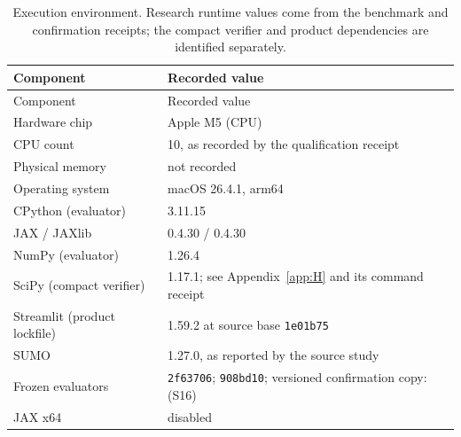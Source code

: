 \documentclass[12pt,a4paper]{article}
\begin{document}
\begingroup
\singlespacing\small
\begin{xltabular}{\textwidth}{@{}lY@{}}
\caption[Execution environment]{Execution environment. Research runtime values come from the benchmark and confirmation receipts; the compact verifier and product dependencies are identified separately.}\label{tab:environment} \\
\toprule
Component & Recorded value \\
\midrule\endfirsthead
\toprule Component & Recorded value \\\midrule\endhead
\bottomrule\endfoot
Hardware chip & Apple M5 (CPU) \\
CPU count & 10, as recorded by the qualification receipt \\
Physical memory & not recorded \\
Operating system & macOS 26.4.1, arm64 \\
CPython (evaluator) & 3.11.15 \\
JAX / JAXlib & 0.4.30 / 0.4.30 \\
NumPy (evaluator) & 1.26.4 \\
SciPy (compact verifier) & 1.17.1; see Appendix~\ref{app:H} and its command receipt \\
Streamlit (product lockfile) & 1.59.2 at source base \texttt{1e01b75} \\
SUMO & 1.27.0, as reported by the source study \cite{ref47} \\
Frozen evaluators & \texttt{2f63706}; \texttt{908bd10}; versioned confirmation copy:  (S16) \\
JAX x64 & disabled \\
\end{xltabular}
\endgroup
\end{document}
